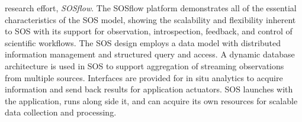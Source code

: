 research effort, \textit{SOSflow}.
%
The SOSflow platform demonstrates all of the essential characteristics
of the SOS model, showing the scalability and flexibility inherent to
SOS with its support for observation, introspection, feedback, and
control of scientific workflows.
%
The SOS design employs a data model with distributed
information management and structured query and access.
%
A dynamic database architecture is used in SOS to support aggregation
of streaming observations from multiple sources.
%
%
Interfaces are provided for in situ analytics to acquire
information and send back results for application actuators.
%
SOS launches with the application, runs along side it, and can acquire
its own resources for scalable data collection and processing.
%


